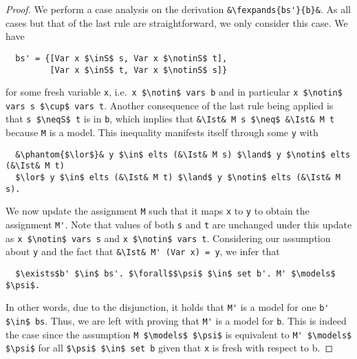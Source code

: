 \documentclass[sigplan,10pt,anonymous,review]{acmart}
\newcommand{\lefttrianglebar}{\mathrel{\tikz[baseline]{\draw (1ex, 0.75ex) -- (0, 1.25ex) -- (0, 0.25ex) -- cycle; \draw (0, 0.75ex) -- (1ex, 0.75ex);}}}
\newcommand{\fexpands}[2]{#1 $\lefttrianglebar$ #2}
\newcommand{\inS}{\in_\text{s}}
\newcommand{\notinS}{\notin_\text{s}}
\newcommand{\neqS}{\neq_\text{s}}
\newcommand{\Ist}{I$_\text{st}$}
\begin{document}
\begin{proof}
  We perform a case analysis on the derivation \lstinline!&\fexpands{bs'}{b}&!.
  As all cases but that of the last rule are straightforward, we only consider this case.
  We have 
\begin{lstlisting}
  bs' = {[Var x $\inS$ s, Var x $\notinS$ t],
         [Var x $\inS$ t, Var x $\notinS$ s]}
\end{lstlisting}
  for some fresh variable \lstinline!x!, i.e.\ \lstinline!x $\notin$ vars b! and in particular \lstinline!x $\notin$ vars s $\cup$ vars t!.
  Another consequence of the last rule being applied is that \lstinline!s $\neqS$ t! is in \lstinline!b!, which implies that \lstinline!&\Ist& M s $\neq$ &\Ist& M t! because \lstinline!M! is a model.
  This inequality manifests itself through some \lstinline!y! with
\begin{lstlisting}
  &\phantom{$\lor$}& y $\in$ elts (&\Ist& M s) $\land$ y $\notin$ elts (&\Ist& M t)
  $\lor$ y $\in$ elts (&\Ist& M t) $\land$ y $\notin$ elts (&\Ist& M s).
\end{lstlisting}
  We now update the assignment \lstinline!M! such that it maps \lstinline!x! to \lstinline!y! to obtain the assignment \lstinline!M'!.
  Note that values of both \lstinline!s! and \lstinline!t! are unchanged under this update as \lstinline!x $\notin$ vars s! and \lstinline!x $\notin$ vars t!.
  Considering our assumption about \lstinline!y! and the fact that \lstinline!&\Ist& M' (Var x) = y!, we infer that
\begin{lstlisting}
  $\exists$b' $\in$ bs'. $\forall$$\psi$ $\in$ set b'. M' $\models$ $\psi$.
\end{lstlisting}
  In other words, due to the disjunction, it holds that \lstinline!M'! is a model for one \lstinline!b' $\in$ bs!.
  Thus, we are left with proving that \lstinline!M'! is a model for \lstinline!b!.
  This is indeed the case since the assumption \lstinline!M $\models$ $\psi$! is equivalent to \lstinline!M' $\models$ $\psi$! for all \lstinline!$\psi$ $\in$ set b! given that \lstinline!x! is fresh with respect to b.
\end{proof}
\end{document}
